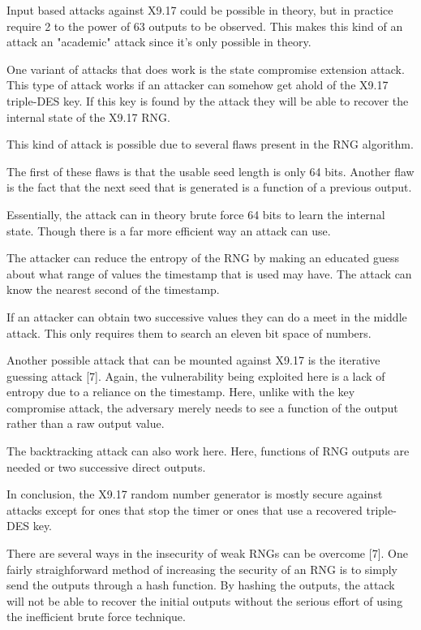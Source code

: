 \documentclass{article}
\begin{document}
    Input based attacks against X9.17 could be possible in theory, but in practice
    require 2 to the power of 63 outputs to be observed. This makes this kind
    of an attack an "academic" attack since it's only possible in theory.

    One variant of attacks that does work is the state compromise extension attack.
    This type of attack works if an attacker can somehow get ahold of the X9.17
    triple-DES key. If this key is found by the attack they will be able
    to recover the internal state of the X9.17 RNG.

    This kind of attack is possible due to several flaws present in the RNG algorithm.

    The first of these flaws is that the usable seed length is only 64 bits.
    Another flaw is the fact that the next seed that is generated is a function
    of a previous output.

    Essentially, the attack can in theory brute force 64 bits to learn the internal state.
    Though there is a far more efficient way an attack can use.

    The attacker can reduce the entropy of the RNG by making an educated guess
    about what range of values the timestamp that is used may have.
    The attack can know the nearest second of the timestamp.

    If an attacker can obtain two successive values they can do a meet in the middle attack.
    This only requires them to search an eleven bit space of numbers.

    Another possible attack that can be mounted against X9.17 is the iterative guessing
    attack [7]. Again, the vulnerability being exploited here is a lack of entropy
    due to a reliance on the timestamp. Here, unlike with the key compromise attack,
    the adversary merely needs to see a function of the output rather than a raw output
    value.

    The backtracking attack can also work here. Here, functions of RNG outputs
    are needed or two successive direct outputs.

    In conclusion, the X9.17 random number generator is mostly secure against
    attacks except for ones that stop the timer or ones that use a recovered triple-DES
    key.


    There are several ways in the insecurity of weak RNGs can be overcome [7].
    One fairly straighforward method of increasing the security of an RNG
    is to simply send the outputs through a hash function. By hashing the outputs,
    the attack will not be able to recover the initial outputs without the
    serious effort of using the inefficient brute force technique.
\end{document}
